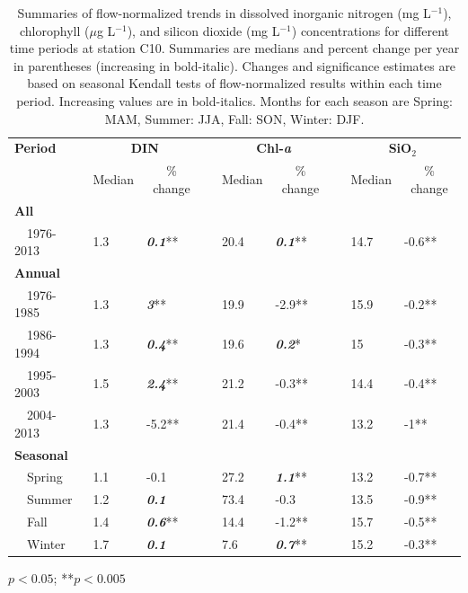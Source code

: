\documentclass[journal = esthag, manuscript = article]{achemso}\usepackage[]{graphicx}\usepackage[]{color}
\begin{document}
\begin{table}[!tbp]
\caption{Summaries of flow-normalized trends in dissolved inorganic nitrogen (mg L$^{-1}$), chlorophyll ($\mu$g L$^{-1}$), and silicon dioxide (mg L$^{-1}$) concentrations for different time periods at station C10. Summaries are  medians and percent change per year in parentheses (increasing in bold-italic).  Changes and significance estimates are based on seasonal Kendall tests of flow-normalized results within each time period. Increasing values are in bold-italics. Months for each season are Spring: MAM, Summer: JJA, Fall: SON, Winter: DJF.\label{tab:c10chg}} 
\begin{center}
\begin{tabular}{lllcllcll}
\hline\hline
\multicolumn{1}{l}{\bfseries Period}&\multicolumn{2}{c}{\bfseries DIN}&\multicolumn{1}{c}{\bfseries }&\multicolumn{2}{c}{\bfseries Chl-\textit{a}}&\multicolumn{1}{c}{\bfseries }&\multicolumn{2}{c}{\bfseries SiO$_2$}\tabularnewline
\cline{2-3} \cline{5-6} \cline{8-9}
\multicolumn{1}{l}{}&\multicolumn{1}{c}{Median}&\multicolumn{1}{c}{\% change}&\multicolumn{1}{c}{}&\multicolumn{1}{c}{Median}&\multicolumn{1}{c}{\% change}&\multicolumn{1}{c}{}&\multicolumn{1}{c}{Median}&\multicolumn{1}{c}{\% change}\tabularnewline
\hline
{\bfseries All}&&&&&&&&\tabularnewline
~~1976-2013&1.3&\textit{\textbf{0.1}}**&&20.4&\textit{\textbf{0.1}}**&&14.7&-0.6**\tabularnewline
\hline
{\bfseries Annual}&&&&&&&&\tabularnewline
~~1976-1985&1.3&\textit{\textbf{3}}**&&19.9&-2.9**&&15.9&-0.2**\tabularnewline
~~1986-1994&1.3&\textit{\textbf{0.4}}**&&19.6&\textit{\textbf{0.2}}*&&15&-0.3**\tabularnewline
~~1995-2003&1.5&\textit{\textbf{2.4}}**&&21.2&-0.3**&&14.4&-0.4**\tabularnewline
~~2004-2013&1.3&-5.2**&&21.4&-0.4**&&13.2&-1**\tabularnewline
\hline
{\bfseries Seasonal}&&&&&&&&\tabularnewline
~~Spring&1.1&-0.1&&27.2&\textit{\textbf{1.1}}**&&13.2&-0.7**\tabularnewline
~~Summer&1.2&\textit{\textbf{0.1}}&&73.4&-0.3&&13.5&-0.9**\tabularnewline
~~Fall&1.4&\textit{\textbf{0.6}}**&&14.4&-1.2**&&15.7&-0.5**\tabularnewline
~~Winter&1.7&\textit{\textbf{0.1}}&&7.6&\textit{\textbf{0.7}}**&&15.2&-0.3**\tabularnewline
\hline
\end{tabular}\end{center}

\footnotesize *$p<0.05$; **$p<0.005$\end{table}
\end{document}
